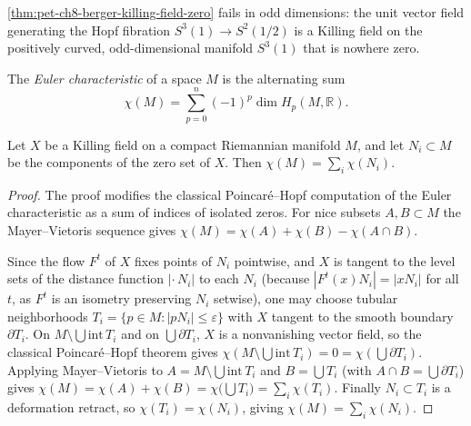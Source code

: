 \begin{remark}
  \label{rem:pet-ch8-berger-odd-dimension-counterexample}
  \cref{thm:pet-ch8-berger-killing-field-zero} fails in odd dimensions: the
  unit vector field generating the Hopf fibration $S^3(1)\to S^2(1/2)$ is a
  Killing field on the positively curved, odd-dimensional manifold $S^3(1)$
  that is nowhere zero.
\end{remark}

\begin{definition}
  \label{def:pet-ch8-euler-characteristic}
  The \emph{Euler characteristic} of a space $M$ is the alternating sum
  \[
    \chi(M)=\sum_{p=0}^n(-1)^p\dim H_p(M,\mathbb{R}).
  \]
\end{definition}

\begin{theorem}[Theorem 8.3.2]
  \label{thm:pet-ch8-euler-characteristic-zero-set-sum}
  Let $X$ be a Killing field on a compact Riemannian manifold $M$, and let
  $N_i\subset M$ be the components of the zero set of $X$. Then
  $\chi(M)=\sum_i\chi(N_i)$.
\end{theorem}
\begin{proof}
  The proof modifies the classical Poincar\'e--Hopf computation of the Euler
  characteristic as a sum of indices of isolated zeros. For nice subsets
  $A,B\subset M$ the Mayer--Vietoris sequence gives
  $\chi(M)=\chi(A)+\chi(B)-\chi(A\cap B)$.

  Since the flow $F^t$ of $X$ fixes points of $N_i$ pointwise, and $X$ is
  tangent to the level sets of the distance function $|{\cdot}\,N_i|$ to each
  $N_i$ (because $|F^t(x)N_i|=|xN_i|$ for all $t$, as $F^t$ is an isometry
  preserving $N_i$ setwise), one may choose tubular neighborhoods
  $T_i=\{p\in M:|pN_i|\le\varepsilon\}$ with $X$ tangent to the smooth boundary
  $\partial T_i$. On $M\setminus\bigcup\mathrm{int}\,T_i$ and on
  $\bigcup\partial T_i$, $X$ is a nonvanishing vector field, so the classical
  Poincar\'e--Hopf theorem gives
  $\chi(M\setminus\bigcup\mathrm{int}\,T_i)=0=\chi(\bigcup\partial T_i)$.
  Applying Mayer--Vietoris to $A=M\setminus\bigcup\mathrm{int}\,T_i$ and
  $B=\bigcup T_i$ (with $A\cap B=\bigcup\partial T_i$) gives
  $\chi(M)=\chi(A)+\chi(B)=\chi\big(\bigcup T_i\big)=\sum_i\chi(T_i)$.
  Finally $N_i\subset T_i$ is a deformation retract, so $\chi(T_i)=\chi(N_i)$,
  giving $\chi(M)=\sum_i\chi(N_i)$.
\end{proof}

